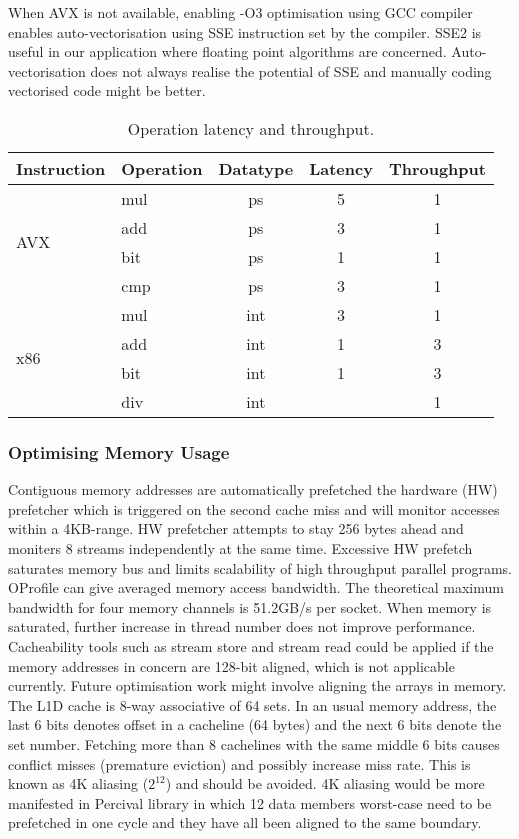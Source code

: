 \documentclass[journal]{IEEEtran}
\begin{document}
When AVX is not available, enabling -O3 optimisation using GCC compiler enables auto-vectorisation using SSE instruction set by the compiler. SSE2 is useful in our application where floating point algorithms are concerned. Auto-vectorisation does not always realise the potential of SSE and manually coding vectorised code might be better. \\

\begin{table}[h]
\centering

\begin{tabular}{l l c c c}
\hline
Instruction & Operation & Datatype & Latency & Throughput \\
\hline \hline
\multirow{4}{*}{AVX}
 & mul & ps 	& 5 	& 1 \\
 & add & ps 	& 3 	& 1 \\
 & bit & ps 	& 1 	& 1 \\
 & cmp & ps 	& 3 	& 1 \\
\hline

\multirow{4}{*}{x86}
 & mul & int 	& 3 	& 1 \\
 & add & int	& 1 	& 3 \\
 & bit & int 	& 1 	& 3 \\
 & div & int 	& \texttildelow 21 	& 1 \\
\hline

\end{tabular}
\caption{Operation latency and throughput.}\label{ops}
\end{table}

\subsubsection{Optimising Memory Usage}
Contiguous memory addresses are automatically prefetched the hardware (HW) prefetcher which is triggered on the second cache miss and will monitor accesses within a 4KB-range. HW prefetcher attempts to stay 256 bytes ahead and moniters 8 streams independently at the same time. Excessive HW prefetch saturates memory bus and limits scalability of high throughput parallel programs. OProfile can give averaged memory access bandwidth. The theoretical maximum bandwidth for four memory channels is 51.2GB/s per socket. When memory is saturated, further increase in thread number does not improve performance. \\
Cacheability tools such as stream store and stream read could be applied if the memory addresses in concern are 128-bit aligned, which is not applicable currently. Future optimisation work might involve aligning the arrays in memory. \\
The L1D cache is 8-way associative of 64 sets. In an usual memory address, the last 6 bits denotes offset in a cacheline (64 bytes) and the next 6 bits denote the set number. Fetching more than 8 cachelines with the same middle 6 bits causes conflict misses (premature eviction) and possibly increase miss rate. This is known as 4K aliasing ($2^12$) and should be avoided. 4K aliasing would be more manifested in Percival library in which 12 data members worst-case need to be prefetched in one cycle and they have all been aligned to the same boundary.  \\
\end{document}
